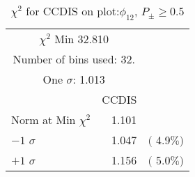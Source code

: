  \begin{table}[h!]\centering
 {\small{
 \begin{tabular}{||l||r||r||}
 \hline
 \hline
\multicolumn{2}{||c||}{$\chi^{2}$ Min  32.810} & \\
 \multicolumn{2}{||c||}{Number of bins used:   32.} & \\
\multicolumn{2}{||c||}{One $\sigma$:    1.013} & \\
 \hline
 \hline
    & CCDIS & \\
Norm at Min $\chi^{2}$  &   1.101 & \\
$-1$ $\sigma$ &   1.047  &  $($  4.9$\%)$  \\
$+1$ $\sigma$ &   1.156  &  $($  5.0$\%)$  \\
 \hline
 \hline
 \end{tabular}
 \caption{$\chi^{2}$ for CCDIS on plot:$\phi_{12}$, $P_\pm \geq 0.5$}
 \label{tab-chicc}
 }}
 \end{table}
 \endinput
